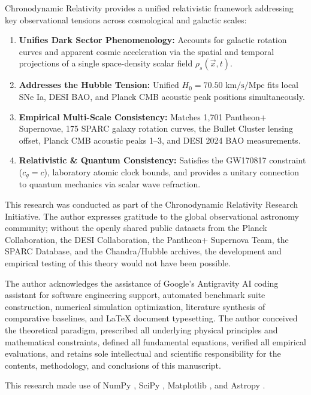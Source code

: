 \documentclass[aps,prd,reprint,superscriptaddress,nofootinbib,floatfix,amsmath,amssymb]{revtex4-2}
\begin{document}
Chronodynamic Relativity provides a unified relativistic framework addressing key observational tensions across cosmological and galactic scales:
\begin{enumerate}
    \item \textbf{Unifies Dark Sector Phenomenology:} Accounts for galactic rotation curves and apparent cosmic acceleration via the spatial and temporal projections of a single space-density scalar field $\rho_s(\vec{x}, t)$.
    \item \textbf{Addresses the Hubble Tension:} Unified $H_0 = 70.50\text{ km/s/Mpc}$ fits local SNe Ia, DESI BAO, and Planck CMB acoustic peak positions simultaneously.
    \item \textbf{Empirical Multi-Scale Consistency:} Matches 1,701 Pantheon+ Supernovae, 175 SPARC galaxy rotation curves, the Bullet Cluster lensing offset, Planck CMB acoustic peaks 1--3, and DESI 2024 BAO measurements.
    \item \textbf{Relativistic \& Quantum Consistency:} Satisfies the GW170817 constraint ($c_g = c$), laboratory atomic clock bounds, and provides a unitary connection to quantum mechanics via scalar wave refraction.
\end{enumerate}

\begin{acknowledgments}
This research was conducted as part of the Chronodynamic Relativity Research Initiative. The author expresses gratitude to the global observational astronomy community; without the openly shared public datasets from the Planck Collaboration, the DESI Collaboration, the Pantheon+ Supernova Team, the SPARC Database, and the Chandra/Hubble archives, the development and empirical testing of this theory would not have been possible.

The author acknowledges the assistance of Google's Antigravity AI coding assistant for software engineering support, automated benchmark suite construction, numerical simulation optimization, literature synthesis of comparative baselines, and \LaTeX{} document typesetting. The author conceived the theoretical paradigm, prescribed all underlying physical principles and mathematical constraints, defined all fundamental equations, verified all empirical evaluations, and retains sole intellectual and scientific responsibility for the contents, methodology, and conclusions of this manuscript.

This research made use of NumPy \cite{numpy2020}, SciPy \cite{scipy2020}, Matplotlib \cite{matplotlib2007}, and Astropy \cite{astropy2022}.
\end{acknowledgments}
\end{document}
